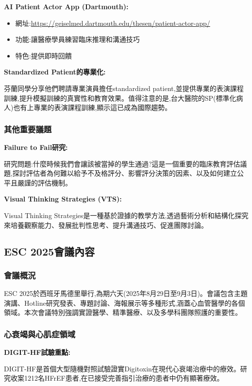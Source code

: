 \documentclass[12pt,a4paper]{article}
\begin{document}
\textbf{AI Patient Actor App (Dartmouth):}
\begin{itemize}[nosep]
    \item 網址:\url{https://geiselmed.dartmouth.edu/thesen/patient-actor-app/}
    \item 功能:讓醫療學員練習臨床推理和溝通技巧
    \item 特色:提供即時回饋
\end{itemize}

\textbf{Standardized Patient的專業化:}

芬蘭同學分享他們聘請專業演員擔任standardized patient,並提供專業的表演課程訓練,提升模擬訓練的真實性和教育效果。值得注意的是,台大醫院的SP(標準化病人)也有上專業的表演課程訓練,顯示這已成為國際趨勢。

\subsubsection{其他重要議題}

\textbf{Failure to Fail研究:}

研究問題:什麼時候我們會讓該被當掉的學生通過?這是一個重要的臨床教育評估議題,探討評估者為何難以給予不及格評分、影響評分決策的因素、以及如何建立公平且嚴謹的評估機制。

\textbf{Visual Thinking Strategies (VTS):}

Visual Thinking Strategies是一種基於證據的教學方法,透過藝術分析和結構化探究來培養觀察能力、發展批判性思考、提升溝通技巧、促進團隊討論。

\subsection{ESC 2025會議內容}

\subsubsection{會議概況}

ESC 2025於西班牙馬德里舉行,為期六天(2025年8月29日至9月3日)。會議包含主題演講、Hotline研究發表、專題討論、海報展示等多種形式,涵蓋心血管醫學的各個領域。本次會議特別強調實證醫學、精準醫療、以及多學科團隊照護的重要性。

\subsubsection{心衰竭與心肌症領域}

\textbf{DIGIT-HF試驗重點:}

DIGIT-HF是首個大型隨機對照試驗證實Digitoxin在現代心衰竭治療中的療效。研究收案1212名HFrEF患者,在已接受完善指引治療的患者中仍有顯著療效。
\end{document}
